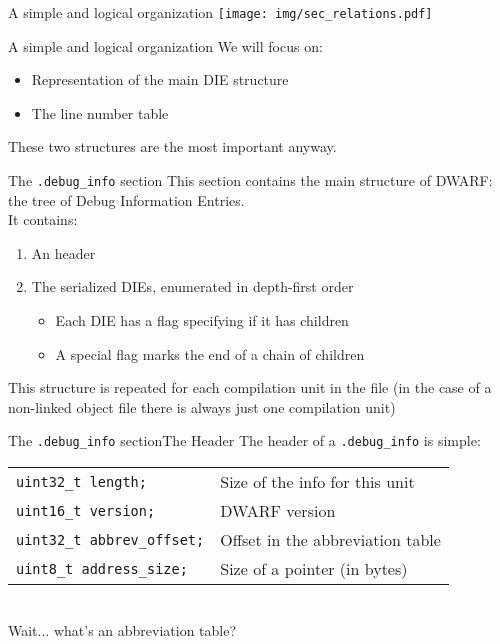\begin{frame}{A simple and logical organization}
\centering
\texttt{[image: img/sec\_relations.pdf]}
\end{frame}


\begin{frame}{A simple and logical organization}
We will focus on:
\begin{itemize}
\item Representation of the main DIE structure
\item The line number table
\end{itemize}
\bigskip
These two structures are the most important anyway.
\end{frame}


\begin{frame}{The \texttt{.debug\_info} section}
This section contains the main structure of DWARF: the tree of Debug
Information Entries.\\
\medskip
It contains:
\begin{enumerate}
\item An header
\item The serialized DIEs, enumerated in depth-first order
	\begin{itemize}
	\normalsize
	\item Each DIE has a flag specifying if it has children
	\item A special flag marks the end of a chain of children
	\end{itemize}
\end{enumerate}
\bigskip
This structure is repeated for each compilation unit in the file
(in the case of a non-linked object file there 
is always just one compilation unit)
\end{frame}


\begin{frame}{The \texttt{.debug\_info} section}{The Header}
The header of a \texttt{.debug\_info} is simple:\\
\medskip
\begin{tabular}{ l l }
\texttt{uint32\_t length;} & Size of the info for this unit \\
\texttt{uint16\_t version;} & DWARF version\\
\texttt{uint32\_t abbrev\_offset;} & Offset in the \alert{abbreviation table} \\
\texttt{uint8\_t address\_size;} & Size of a pointer (in bytes) \\
\end{tabular}\\
\bigskip
Wait... what's an \alert{abbreviation table}?
\end{frame}


